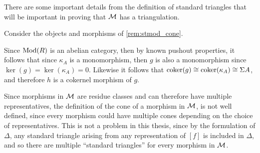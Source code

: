 There are some important details from the definition of standard triangles that will be important in proving that \( {\mathcal{M}} \) has a triangulation.

\begin{remark}
    \label{rem:stmod_cone_pushout_properties}
    Consider the objects and morphisms of \autoref{rem:stmod_cone}.

    Since \( \operatorname{Mod}(R) \) is an abelian category, then by known pushout properties, it follows that since \( \kappa_A \) is a monomorphism, then \( g \) is also a monomorphism since \( \ker(g) = \ker(\kappa_A) = 0 \). Likewise it follows that \( \operatorname{coker}(g) \cong \operatorname{coker}(\kappa_A) \cong \Sigma A \), and therefore \( h \) is a cokernel morphism of \( g \).
\end{remark}


Since morphisms in \( {\mathcal{M}} \) are residue classes and can therefore have multiple representatives, the definition of the cone of a morphism in \( {\mathcal{M}} \), is not well defined, since every morphism could have multiple cones depending on the choice of representatives. This is not a problem in this thesis, since by the formulation of \( \Delta \), any standard triangle arising from any representation of \( [f] \) is included in \( \Delta \), and so there are multiple ``standard triangles'' for every morphism in \( {\mathcal{M}} \).


